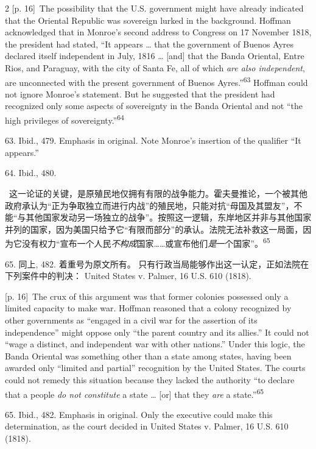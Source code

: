 \documentclass[10pt,a4paper]{article}
\begin{document}
\begin{paracol}{2}
\switchcolumn
{\scriptsize\color{gray} [p. 16]}\ The possibility that the U.S. government might have already indicated that the Oriental Republic was sovereign lurked in the background. Hoffman acknowledged that in Monroe’s second address to Congress on 17 November 1818, the president had stated, “It appears … that the government of Buenos Ayres declared itself independent in July, 1816 … [and] that the Banda Oriental, Entre Rios, and Paraguay, with the city of Santa Fe, all of which \textit{are also independent}, are unconnected with the present government of Buenos Ayres.”\nobreak\textsuperscript{63} Hoffman could not ignore Monroe’s statement. But he suggested that the president had recognized only some aspects of sovereignty in the Banda Oriental and not “the high privileges of sovereignty.”\nobreak\textsuperscript{64}\par{\small 63. Ibid., 479. Emphasis in original. Note Monroe’s insertion of the qualifier “It appears.”\par}{\small 64. Ibid., 480.\par}
\switchcolumn*
{\scriptsize\color{gray} [p. 16]}\ 这一论证的关键，是原殖民地仅拥有有限的战争能力。霍夫曼推论，一个被其他政府承认为“正为争取独立而进行内战”的殖民地，只能对抗“母国及其盟友”，不能“与其他国家发动另一场独立的战争”。按照这一逻辑，东岸地区并非与其他国家并列的国家，因为美国只给予它“有限而部分”的承认。法院无法补救这一局面，因为它没有权力“宣布一个人民\textit{不构成}国家……或宣布他们\textit{是}一个国家”。\nobreak\textsuperscript{65}\par{\small 65. 同上, 482. 着重号为原文所有。 只有行政当局能够作出这一认定，正如法院在下列案件中的判决： United States v. Palmer, 16 U.S. 610 (1818).\par}
\switchcolumn
{\scriptsize\color{gray} [p. 16]}\ The crux of this argument was that former colonies possessed only a limited capacity to make war. Hoffman reasoned that a colony recognized by other governments as “engaged in a civil war for the assertion of its independence” might oppose only “the parent country and its allies.” It could not “wage a distinct, and independent war with other nations.” Under this logic, the Banda Oriental was something other than a state among states, having been awarded only “limited and partial” recognition by the United States. The courts could not remedy this situation because they lacked the authority “to declare that a people \textit{do not constitute} a state … [or] that they \textit{are} a state.”\nobreak\textsuperscript{65}\par{\small 65. Ibid., 482. Emphasis in original. Only the executive could make this determination, as the court decided in United States v. Palmer, 16 U.S. 610 (1818).\par}

\end{paracol}
\end{document}

